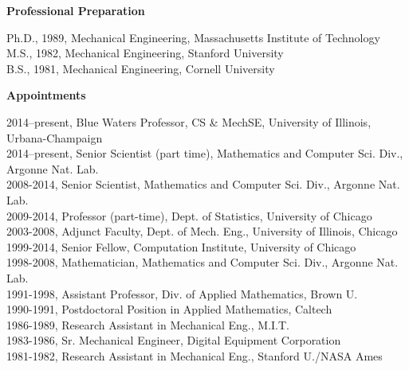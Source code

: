 \documentclass[11pt,letterpaper,english]{article}
\begin{document}
\begin{flushleft} {\bf Professional Preparation}
{\parindent 16pt

Ph.D., 1989, Mechanical Engineering, Massachusetts Institute of Technology \\
M.S., 1982, Mechanical Engineering, Stanford University \\
B.S., 1981, Mechanical Engineering, Cornell University \\
}

\vspace{.04in}
{\bf Appointments}
{\parindent 16pt

2014--present, Blue Waters Professor, CS \& MechSE, University of Illinois, Urbana-Champaign \\
2014--present, Senior Scientist (part time), Mathematics and Computer Sci. Div., Argonne Nat. Lab.\\
2008-2014, Senior Scientist, Mathematics and Computer Sci. Div., Argonne Nat. Lab. \\
2009-2014, Professor (part-time), Dept. of Statistics, University of Chicago \\
2003-2008, Adjunct Faculty, Dept. of Mech. Eng., University of Illinois, Chicago \\
1999-2014, Senior Fellow, Computation Institute, University of Chicago \\
1998-2008, Mathematician, Mathematics and Computer Sci. Div., Argonne Nat. Lab. \\
1991-1998, Assistant Professor, Div. of Applied Mathematics, Brown U. \\
1990-1991, Postdoctoral Position in Applied Mathematics, Caltech \\
1986-1989, Research Assistant in Mechanical Eng., M.I.T. \\
1983-1986, Sr. Mechanical Engineer, Digital Equipment Corporation \\
1981-1982, Research Assistant in Mechanical Eng., Stanford U./NASA Ames \\
}


\end{flushleft}
\end{document}
